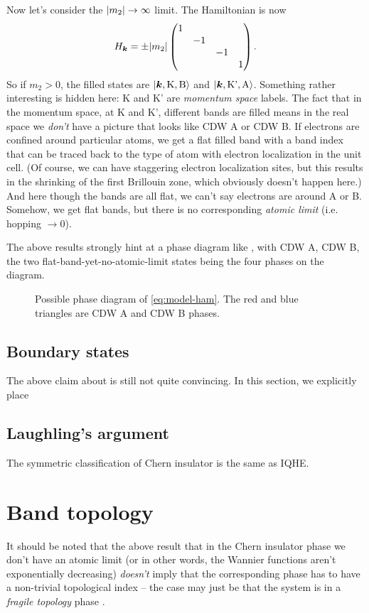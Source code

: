 \documentclass[hyperref, a4paper]{article}
\begin{document}
Now let's consider the $\abs{m_2} \to \infty$ limit.
The Hamiltonian is now 
\begin{equation}
    H_{\vb*{k}} = \pm \abs{m_2} \pmqty{\dmat{1, -1, -1, 1}}.
\end{equation}
So if $m_2 > 0$, the filled states are $\ket{\vb*{k}, \text{K}, \text{B}}$
and $\ket{\vb*{k}, \text{K'}, \text{A}}$.
Something rather interesting is hidden here:
K and K' are \emph{momentum space} labels.
The fact that in the momentum space,
at K and K',
different bands are filled 
means in the real space we \emph{don't} have a picture that looks like CDW A or CDW B.
If electrons are confined around particular atoms,
we get a flat filled band
with a band index that can be traced back to the type of atom with electron localization in the unit cell.
(Of course, we can have staggering electron localization sites,
but this results in the shrinking of the first Brillouin zone,
which obviously doesn't happen here.)
And here though the bands are all flat,
we can't say electrons are around A or B.
Somehow, we get flat bands,
but there is no corresponding \emph{atomic limit} (i.e. hopping $\to 0$).

The above results strongly hint at a phase diagram like ,
with CDW A, CDW B, the two flat-band-yet-no-atomic-limit states 
being the four phases on the diagram.

\begin{figure}
    \centering
    
    \caption{Possible phase diagram of \eqref{eq:model-ham}. The red and blue triangles are CDW A and CDW B phases.}
    \label{fig:possible-phase-1}
\end{figure}

\subsection{Boundary states}

The above claim about  is still not quite convincing.
In this section, 
we explicitly place

\subsection{Laughling's argument}

The symmetric classification of Chern insulator is the same as IQHE.

\section{Band topology}

It should be noted that the above result that in the Chern insulator phase
we don't have an atomic limit 
(or in other words, the Wannier functions aren't exponentially decreasing)
\emph{doesn't} imply that the corresponding phase 
has to have a non-trivial topological index
-- the case may just be that the system is in a \emph{fragile topology} phase
\cite{po2018fragile}.



\end{document}
